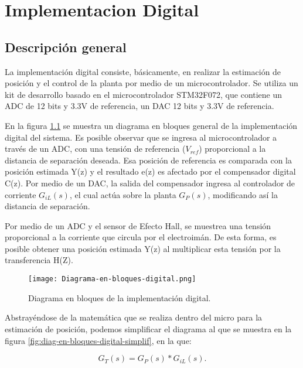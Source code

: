 \chapter{Implementacion Digital}  \label{cap:Implementacion digital}

\section{Descripción general}

\noindent La implementación digital consiste, básicamente, en realizar la estimación de posición y el control de la planta por medio de un microcontrolador. Se utiliza un kit de desarrollo basado en el microcontrolador STM32F072, que contiene un ADC de 12 bits y 3.3V de referencia, un DAC 12 bits y 3.3V de referencia.

\noindent En la figura \ref{fig:diag-en-bloques-digital} se muestra un diagrama en bloques general de la implementación digital del sistema. Es posible observar que se ingresa al microcontrolador a través de un ADC, con una tensión de referencia ($V_{ref}$) proporcional a la distancia de separación deseada. Esa posición de referencia es comparada con la posición estimada Y(z) y el resultado e(z) es afectado por el compensador digital C(z). Por medio de un DAC, la salida del compensador ingresa al controlador de corriente $G_{iL}(s)$, el cual actúa sobre la planta $G_P(s)$, modificando así la distancia de separación.

\noindent Por medio de un ADC y el sensor de Efecto Hall, se muestrea una tensión proporcional a la corriente que circula por el electroimán. De esta forma, es posible obtener una posición estimada Y(z) al multiplicar esta tensión por la transferencia H(Z).


\begin{figure}[H]
	\centering
	\texttt{[image: Diagrama-en-bloques-digital.png]}
	\caption{Diagrama en bloques de la implementación digital.}
	\label{fig:diag-en-bloques-digital}
\end{figure}

\noindent Abstrayéndose de la matemática que se realiza dentro del micro para la estimación de posición, podemos simplificar el diagrama al que se muestra en la figura \ref{fig:diag-en-bloques-digital-simplif}, en la que:

\begin{equation} 
	G_T(s) = G_P(s) * G_{iL}(s).
\end{equation}

